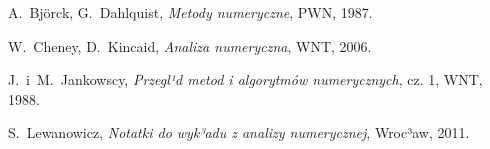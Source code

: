 \documentclass[11pt,leqno]{article}
\begin{document}
\thispagestyle{empty}
\begin{thebibliography}{99}

  A.~Bj\"orck, G.~Dahlquist, \textit{Metody numeryczne\/}, PWN,
              1987.

 W.~Cheney, D.~Kincaid, \textit{Analiza numeryczna\/}, WNT, 2006.

  J.~i~M.~Jankowscy, \textit{Przegl¹d metod i algorytmów
              numerycznych\/}, cz. 1, WNT, 1988.

   S.~Lewanowicz, \textit{Notatki do wyk³adu z analizy numerycznej},
              Wroc³aw, 2011.
	  
\end{thebibliography}
\end{document}
